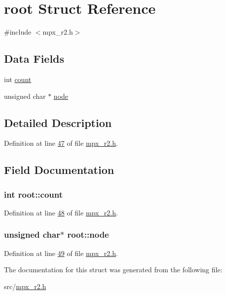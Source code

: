 \hypertarget{structroot}{
\section{root Struct Reference}
\label{structroot}
}


{\ttfamily \#include $<$mpx\_\-r2.h$>$}

\subsection*{Data Fields}
\begin{DoxyCompactItemize}
\item 
int \hyperlink{structroot_afa78d0408d4af29e936332a04739d59c}{count}
\item 
unsigned char $\ast$ \hyperlink{structroot_acf8c9d6dbd37a892a1b45394c1595f1a}{node}
\end{DoxyCompactItemize}


\subsection{Detailed Description}


Definition at line \hyperlink{mpx__r2_8h_source_l00047}{47} of file \hyperlink{mpx__r2_8h_source}{mpx\_\-r2.h}.



\subsection{Field Documentation}
\hypertarget{structroot_afa78d0408d4af29e936332a04739d59c}{
\subsubsection[{count}]{\setlength{\rightskip}{0pt plus 5cm}int {\bf root::count}}}
\label{structroot_afa78d0408d4af29e936332a04739d59c}


Definition at line \hyperlink{mpx__r2_8h_source_l00048}{48} of file \hyperlink{mpx__r2_8h_source}{mpx\_\-r2.h}.

\hypertarget{structroot_acf8c9d6dbd37a892a1b45394c1595f1a}{
\subsubsection[{node}]{\setlength{\rightskip}{0pt plus 5cm}unsigned char$\ast$ {\bf root::node}}}
\label{structroot_acf8c9d6dbd37a892a1b45394c1595f1a}


Definition at line \hyperlink{mpx__r2_8h_source_l00049}{49} of file \hyperlink{mpx__r2_8h_source}{mpx\_\-r2.h}.



The documentation for this struct was generated from the following file:\begin{DoxyCompactItemize}
\item 
src/\hyperlink{mpx__r2_8h}{mpx\_\-r2.h}\end{DoxyCompactItemize}
